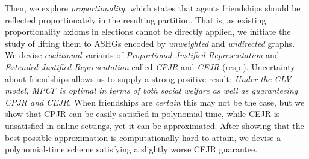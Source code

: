 \documentclass[letterpaper]{article}
\begin{document}
Then, we explore \textit{proportionality}, which states that agents friendships should be reflected proportionately in the resulting partition. That is, as existing proportionality axioms in elections cannot be directly applied, we initiate the study of lifting them to ASHGs encoded by \textit{unweighted} and \textit{undirected} graphs. We devise \textit{coalitional} variants of \textit{Proportional Justified Representation} \cite{sanchez2017proportional} and \textit{Extended Justified Representation}  \cite{aziz2017justified} called \textit{CPJR} and \textit{CEJR} (resp.). Uncertainty about friendships allows us to supply a strong positive result: \textit{Under the CLV model, MPCF is optimal in terms of both social welfare as well as guaranteeing CPJR and CEJR}. %
When friendships are \textit{certain} this may not be the case, but we show that CPJR can be easily satisfied in polynomial-time, while CEJR is unsatisfied in online settings, yet it can be approximated. After showing that the best possible approximation is computationally hard to attain, we devise a polynomial-time scheme satisfying a slightly worse CEJR guarantee. %
\end{document}
